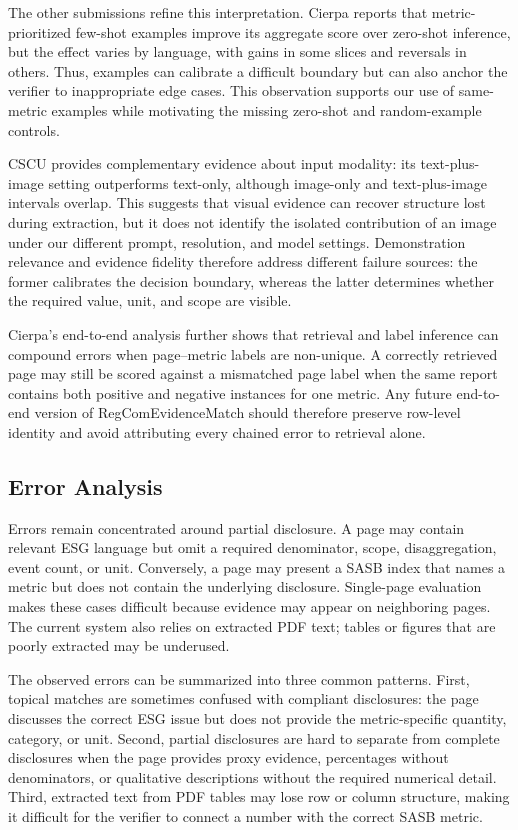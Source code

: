 \documentclass[sigconf,article]{acmart}
\newcommand{\RegComEvidenceMatch}{RegCom\-Evidence\-Match}
\begin{document}
The other submissions refine this interpretation. Cierpa reports that metric-prioritized few-shot examples improve its aggregate score over zero-shot inference, but the effect varies by language, with gains in some slices and reversals in others. Thus, examples can calibrate a difficult boundary but can also anchor the verifier to inappropriate edge cases. This observation supports our use of same-metric examples while motivating the missing zero-shot and random-example controls.

CSCU provides complementary evidence about input modality: its text-plus-image setting outperforms text-only, although image-only and text-plus-image intervals overlap. This suggests that visual evidence can recover structure lost during extraction, but it does not identify the isolated contribution of an image under our different prompt, resolution, and model settings. Demonstration relevance and evidence fidelity therefore address different failure sources: the former calibrates the decision boundary, whereas the latter determines whether the required value, unit, and scope are visible.

Cierpa's end-to-end analysis further shows that retrieval and label inference can compound errors when page--metric labels are non-unique. A correctly retrieved page may still be scored against a mismatched page label when the same report contains both positive and negative instances for one metric. Any future end-to-end version of \RegComEvidenceMatch{} should therefore preserve row-level identity and avoid attributing every chained error to retrieval alone.

\subsection{Error Analysis}
Errors remain concentrated around partial disclosure. A page may contain relevant ESG language but omit a required denominator, scope, disaggregation, event count, or unit. Conversely, a page may present a SASB index that names a metric but does not contain the underlying disclosure. Single-page evaluation makes these cases difficult because evidence may appear on neighboring pages. The current system also relies on extracted PDF text; tables or figures that are poorly extracted may be underused.

The observed errors can be summarized into three common patterns. First, topical matches are sometimes confused with compliant disclosures: the page discusses the correct ESG issue but does not provide the metric-specific quantity, category, or unit. Second, partial disclosures are hard to separate from complete disclosures when the page provides proxy evidence, percentages without denominators, or qualitative descriptions without the required numerical detail. Third, extracted text from PDF tables may lose row or column structure, making it difficult for the verifier to connect a number with the correct SASB metric.
\end{document}
